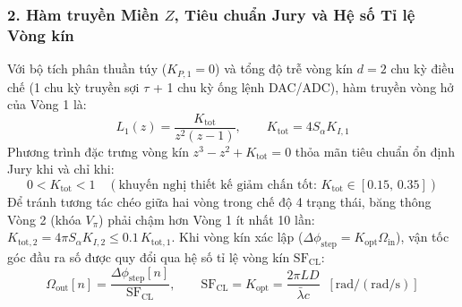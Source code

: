 \documentclass[11pt, a4paper]{article}
\begin{document}
\subsubsection*{2. Hàm truyền Miền $Z$, Tiêu chuẩn Jury và Hệ số Tỉ lệ Vòng kín}
Với bộ tích phân thuần túy ($K_{P,1}=0$) và tổng độ trễ vòng kín $d = 2$ chu kỳ điều chế (1 chu kỳ truyền sợi $\tau$ + 1 chu kỳ ống lệnh DAC/ADC), hàm truyền vòng hở của Vòng 1 là:
\begin{equation}
L_1(z) = \frac{K_{\text{tot}}}{z^2 (z - 1)}, \qquad
K_{\text{tot}} = 4 S_\alpha K_{I,1}
\end{equation}
Phương trình đặc trưng vòng kín $z^3 - z^2 + K_{\text{tot}} = 0$ thỏa mãn tiêu chuẩn ổn định Jury khi và chỉ khi:
\begin{equation}
0 < K_{\text{tot}} < 1 \quad (\text{khuyến nghị thiết kế giảm chấn tốt: } K_{\text{tot}} \in [0.15,\, 0.35])
\end{equation}
Để tránh tương tác chéo giữa hai vòng trong chế độ 4 trạng thái, băng thông Vòng 2 (khóa $V_\pi$) phải chậm hơn Vòng 1 ít nhất 10 lần: $K_{\text{tot},2} = 4\pi S_\alpha K_{I,2} \le 0.1\,K_{\text{tot},1}$. Khi vòng kín xác lập ($\Delta\phi_{\text{step}} = K_{\text{opt}}\Omega_{\text{in}}$), vận tốc góc đầu ra số được quy đổi qua hệ số tỉ lệ vòng kín $\mathrm{SF}_{\text{CL}}$:
\begin{equation}
\Omega_{\text{out}}[n] = \frac{\Delta\phi_{\text{step}}[n]}{\mathrm{SF}_{\text{CL}}}, \qquad
\mathrm{SF}_{\text{CL}} = K_{\text{opt}} = \frac{2\pi L D}{\bar{\lambda} c} \;\; [\text{rad}/(\text{rad}/\text{s})]
\end{equation}
\end{document}
